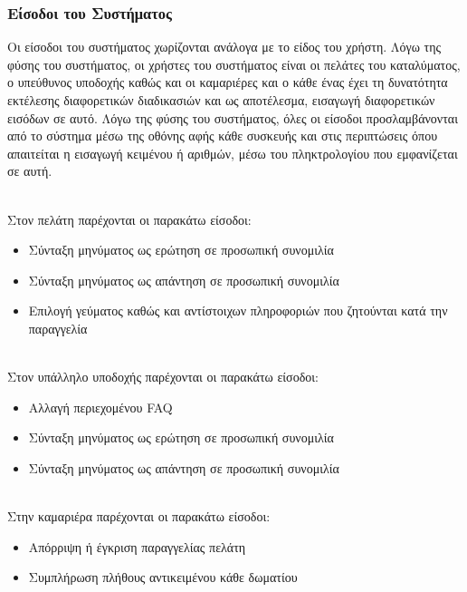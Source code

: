 \subsubsection{Είσοδοι του Συστήματος}
Οι είσοδοι του συστήματος χωρίζονται ανάλογα με το είδος του χρήστη. Λόγω της φύσης του 
συστήματος, οι χρήστες του συστήματος είναι οι πελάτες του καταλύματος, ο υπεύθυνος υποδοχής 
καθώς και οι καμαριέρες και ο κάθε ένας έχει τη δυνατότητα εκτέλεσης διαφορετικών διαδικασιών και ως
αποτέλεσμα, εισαγωγή διαφορετικών εισόδων σε αυτό.  Λόγω της φύσης του συστήματος, όλες οι 
είσοδοι προσλαμβάνονται από το σύστημα μέσω της οθόνης αφής κάθε συσκευής και στις περιπτώσεις
όπου απαιτείται η εισαγωγή κειμένου ή αριθμών, μέσω του πληκτρολογίου που εμφανίζεται σε αυτή.

\noindent \\ 
Στον πελάτη παρέχονται οι παρακάτω είσοδοι:
\begin{itemize}
	\item Σύνταξη μηνύματος ως ερώτηση σε προσωπική συνομιλία
	\item Σύνταξη μηνύματος ως απάντηση σε προσωπική συνομιλία
	\item Επιλογή γεύματος καθώς και αντίστοιχων πληροφοριών που ζητούνται κατά την παραγγελία
\end{itemize}

\noindent \\ 
Στον υπάλληλο υποδοχής παρέχονται οι παρακάτω είσοδοι:
\begin{itemize}
	\item Αλλαγή περιεχομένου FAQ
	\item Σύνταξη μηνύματος ως ερώτηση σε προσωπική συνομιλία
	\item Σύνταξη μηνύματος ως απάντηση σε προσωπική συνομιλία 
\end{itemize}

\noindent \\ 
Στην καμαριέρα παρέχονται οι παρακάτω είσοδοι:
\begin{itemize}
	\item Απόρριψη ή έγκριση παραγγελίας πελάτη
	\item Συμπλήρωση πλήθους αντικειμένου κάθε δωματίου
\end{itemize}


